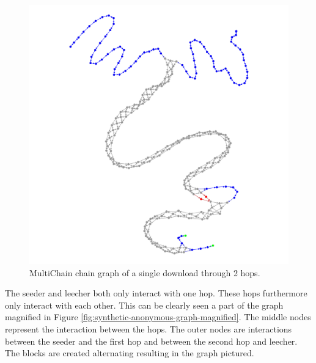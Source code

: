 \begin{figure}
	\centerline{\includegraphics[scale=0.1]{experimentation/anonymous/anonymous.png}}
	\caption{MultiChain chain graph of a single download through 2 hops.}
	\label{fig:synthetic-anonymous-graph}
\end{figure}

The seeder and leecher both only interact with one hop.
These hops furthermore only interact with each other.
This can be clearly seen a part of the graph magnified in Figure \ref{fig:synthetic-anonymous-graph-magnified}.
The middle nodes represent the interaction between the hops.
The outer nodes are interactions between the seeder and the first hop and between the second hop and leecher.
The blocks are created alternating resulting in the graph pictured.

